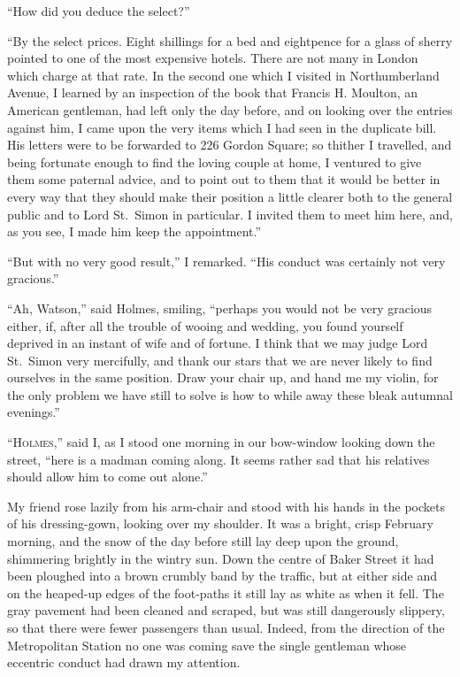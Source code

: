 “How did you deduce the select?”

“By the select prices. Eight shillings for a bed and
eightpence for a glass of sherry pointed to one of the most
expensive hotels. There are not many in London which charge at
that rate. In the second one which I visited in Northumberland
Avenue, I learned by an inspection of the book that Francis
H. Moulton, an American gentleman, had left only the day
before, and on looking over the entries against him, I came
upon the very items which I had seen in the duplicate bill.
His letters were to be forwarded to 226 Gordon Square; so
thither I travelled, and being fortunate enough to find the
loving couple at home, I ventured to give them some paternal
advice, and to point out to them that it would be better in
every way that they should make their position a little clearer
both to the general public and to Lord St.~Simon in particular.
I invited them to meet him here, and, as you see, I
made him keep the appointment.”

“But with no very good result,” I remarked. “His conduct
was certainly not very gracious.”

“Ah, Watson,” said Holmes, smiling, “perhaps you would
not be very gracious either, if, after all the trouble of wooing
and wedding, you found yourself deprived in an instant of
wife and of fortune. I think that we may judge Lord St.~Simon
very mercifully, and thank our stars that we are never likely
to find ourselves in the same position. Draw your chair up,
and hand me my violin, for the only problem we have still to
solve is how to while away these bleak autumnal evenings.”


“\textsc{Holmes},” said I, as I stood one morning in our
bow-window looking down the street, “here is a
madman coming along. It seems rather sad that
his relatives should allow him to come out alone.”

My friend rose lazily from his arm-chair and stood with
his hands in the pockets of his dressing-gown, looking over
my shoulder. It was a bright, crisp February morning, and
the snow of the day before still lay deep upon the ground,
shimmering brightly in the wintry sun. Down the centre of
Baker Street it had been ploughed into a brown crumbly band
by the traffic, but at either side and on the heaped-up edges of
the foot-paths it still lay as white as when it fell. The gray
pavement had been cleaned and scraped, but was still dangerously
slippery, so that there were fewer passengers than usual.
Indeed, from the direction of the Metropolitan Station no one
was coming save the single gentleman whose eccentric conduct
had drawn my attention.

